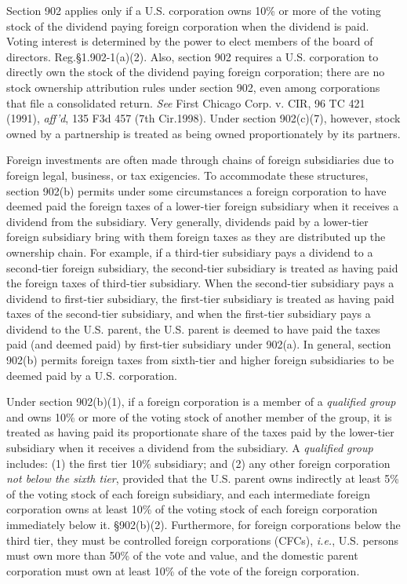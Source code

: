 Section 902 applies only if a U.S. corporation owns 10\% or more of the voting stock of the dividend paying foreign corporation when the dividend is paid.  Voting interest is determined by the power to elect members of the board of directors.  Reg.\@ \S 1.902-1(a)(2).     Also, section 902 requires a U.S. corporation to directly own the stock of the dividend paying foreign corporation; there are no stock ownership attribution rules under section 902, even among corporations that file a consolidated return.   \emph{See} First Chicago Corp. v. CIR, 96 TC 421 (1991), \emph{aff'd}, 135 F3d 457 (7th Cir.\@ 1998).  Under section 902(c)(7), however, stock owned by a partnership is treated as being owned proportionately by its partners.  

Foreign investments are often made through chains of foreign subsidiaries due to foreign legal, business, or tax exigencies.  To accommodate these structures, section 902(b) permits under some circumstances a foreign corporation to have deemed paid the foreign taxes of a lower-tier foreign subsidiary when it receives a dividend from the subsidiary.  Very generally, dividends paid by a lower-tier foreign subsidiary bring with them foreign taxes as they are distributed up the ownership chain.  For example, if a third-tier subsidiary pays a dividend to a second-tier foreign subsidiary, the second-tier subsidiary is treated as having paid the foreign taxes of third-tier subsidiary.  When the second-tier subsidiary pays a dividend to first-tier subsidiary, the first-tier subsidiary is treated as having paid taxes of the second-tier subsidiary,  and when the first-tier subsidiary pays a dividend to the U.S. parent, the U.S. parent is deemed to have paid the taxes paid (and deemed paid) by first-tier subsidiary under 902(a).  In general, section 902(b) permits foreign taxes from sixth-tier and higher foreign subsidiaries to be deemed paid by a U.S. corporation.  

Under section 902(b)(1), if a foreign corporation is a member of a \emph{qualified group} and owns 10\% or more of the voting stock of another member of the group, it is treated as having paid its proportionate share of the taxes paid by the lower-tier subsidiary when it receives a dividend from the subsidiary.  A \emph{qualified group} includes: (1) the first tier 10\% subsidiary; and (2) any other foreign corporation \emph{not below the sixth tier}, provided that the U.S. parent owns indirectly at least 5\% of the voting stock of each foreign subsidiary, and each intermediate foreign corporation owns at least 10\% of the voting stock of each foreign corporation immediately below it.  \S902(b)(2).  Furthermore, for foreign corporations below the third tier, they must be controlled foreign corporations (CFCs), \emph{i.e.}, U.S. persons must own more than 50\% of the vote and value, and the domestic parent corporation must own at least 10\% of the vote of the foreign corporation.   

